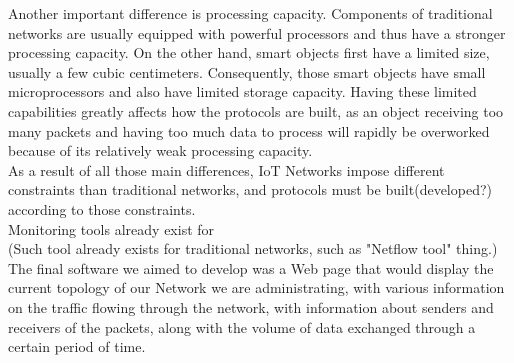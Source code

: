 Another important difference is processing capacity. Components of traditional networks are usually equipped with powerful processors and thus have a stronger processing capacity. On the other hand, smart objects first have a limited size, usually a few cubic centimeters. Consequently, those smart objects have small microprocessors and also have limited storage capacity. Having these limited capabilities greatly affects how the protocols are built, as an object receiving too many packets and having too much data to process will rapidly be overworked because of its relatively weak processing capacity. \\

As a result of all those main differences, IoT Networks impose different constraints than traditional networks, and protocols must be built(developed?) according to those constraints.\\

Monitoring tools already exist for \\

(Such tool already exists for traditional networks, such as "Netflow tool" thing.)\\

The final software we aimed to develop was a Web page that would display the current topology of our Network we are administrating, with various information on the traffic flowing through the network, with information about senders and receivers of the packets, along with the volume of data exchanged through a certain period of time.
